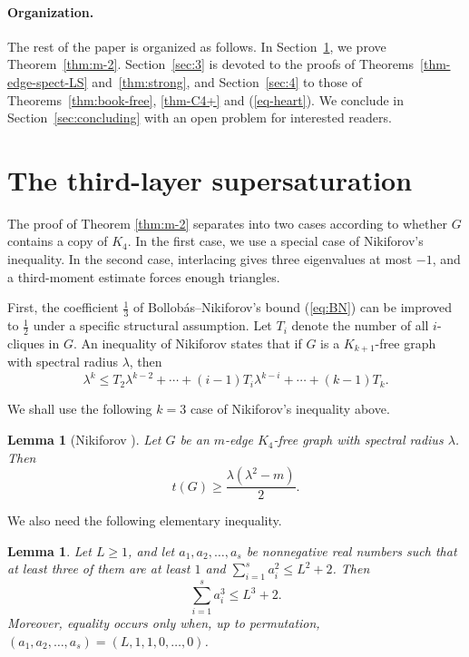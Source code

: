 \documentclass[11pt,a4paper]{article}
\newtheorem{lemma}[theorem]{Lemma}
\theoremstyle{definition}
\theoremstyle{plain}
\renewcommand{\le}{\leqslant}
\renewcommand{\ge}{\geqslant}
\begin{document}
\paragraph{Organization.}
The rest of the paper is organized as follows. 
In Section~\ref{sec:2}, we prove Theorem~\ref{thm:m-2}. 
Section~\ref{sec:3} is devoted to the proofs of Theorems~\ref{thm-edge-spect-LS} and~\ref{thm:strong}, 
and Section~\ref{sec:4} to those of Theorems~\ref{thm:book-free}, \ref{thm-C4+} 
and (\ref{eq-heart}). 
We conclude in Section~\ref{sec:concluding} with an open problem for interested readers.



\section{The third-layer supersaturation}

\label{sec:2}
The proof of Theorem \ref{thm:m-2} separates into two cases according to
whether $G$ contains a copy of $K_4$.  In the first case,  we use a special case of
Nikiforov's inequality.  In the second case, interlacing gives
three eigenvalues at most $-1$, and a third-moment estimate forces enough
triangles. 


First, the coefficient $\frac{1}{3}$ of Bollob\'{a}s--Nikiforov's bound (\ref{eq:BN}) can be improved to $\frac{1}{2}$ under a specific structural assumption. Let $T_i$ denote the number of all $i$-cliques in $G$.  
An inequality of Nikiforov \cite{Nikiforov2002} states that if $G$ is a $K_{k+1}$-free graph with spectral radius $\lambda$, then
\begin{equation*} 
\lambda^k \le T_2 \lambda^{k-2} + \cdots + (i-1)T_i \lambda^{k-i} + \cdots + (k-1)T_k.  
\end{equation*}


We shall use the following $k=3$ case of Nikiforov's inequality above.

\begin{lemma}[Nikiforov \cite{Nikiforov2002}]
\label{lem:K4free}
Let $G$ be an $m$-edge $K_4$-free graph with  spectral radius $\lambda $.  Then
\[
    t(G)\ge \frac{\lambda (\lambda^2-m)}{2}.
\]
\end{lemma}



We also need the following elementary inequality.

\begin{lemma}
\label{lem:cubes}
Let $L\ge 1$, and let $a_1,a_2,\dots,a_s$ be nonnegative real numbers such that at
least three of them are at least $1$ and
$\sum_{i=1}^s a_i^2\le L^2+2$. 
Then
\[
        \sum_{i=1}^s a_i^3\le L^3+2.
\]
Moreover, equality occurs only when, up to permutation, $ (a_1,a_2,\dots,a_s)=(L,1,1,0,\ldots ,0)$.
\end{lemma}
\end{document}
